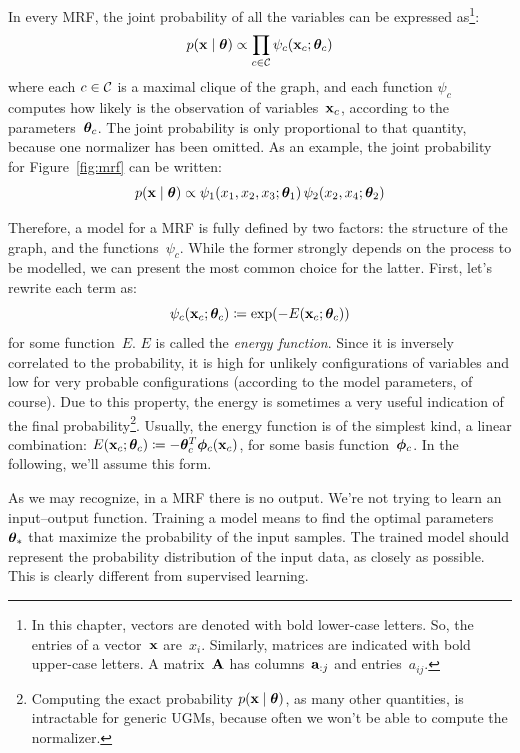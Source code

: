 In every MRF, the joint probability of all the variables can be expressed
as\footnote{In this chapter, vectors are denoted with bold lower-case letters.
So, the entries of a vector~$\mathbf{x}$ are~$x_i$. Similarly, matrices are indicated
with bold upper-case letters. A matrix~$\mathbf{A}$ has columns~$\mathbf{a}_{:j}$
and entries~$a_{ij}$.}:
\begin{equation}
	p(\mathbf{x} \mid \bm{\theta}) \propto
		\prod_{c \in \mathcal{C}} \psi_c(\mathbf{x}_c; \bm{\theta}_c)
\end{equation}
where each $c \in \mathcal{C}$ is a maximal clique of the graph, and each
function $\psi_c$ computes how likely is the observation of variables~$\mathbf{x}_c$,
according to the parameters~$\bm{\theta}_c$. The joint probability is only
proportional to that quantity, because one normalizer has been omitted. As an
example, the joint probability for Figure~\ref{fig:mrf} can be written:
\[
	p(\mathbf{x} \mid \bm{\theta}) \propto
	\psi_1(x_1, x_2, x_3; \bm{\theta}_1) \, \psi_2(x_2, x_4; \bm{\theta}_2)
\]

Therefore, a model for a MRF is fully defined by two factors: the structure of
the graph, and the functions~$\psi_c$. While the former strongly depends on
the process to be modelled, we can present the most common choice for the
latter. First, let's rewrite each term as:
\begin{equation}
	\psi_c(\mathbf{x}_c; \bm{\theta}_c) \coloneqq \exp(-E(\mathbf{x}_c; \bm{\theta}_c))
	\label{eq:ugm-energy-based}
\end{equation}
for some function~$E$. $E$ is called the \emph{energy function}. Since it is
inversely correlated to the probability, it is high for unlikely
configurations of variables and low for very probable configurations
(according to the model parameters, of course). Due to this property, the
energy is sometimes a very useful indication of the final
probability\footnote{Computing the exact probability $p(\mathbf{x} \mid \bm{\theta})$,
as many other quantities, is intractable for generic UGMs, because often we
won't be able to compute the normalizer.}.  Usually, the energy function is of
the simplest kind, a linear combination: $E(\mathbf{x}_c; \bm{\theta}_c) \coloneqq
-\bm{\theta}_c^T \bm{\phi}_c(\mathbf{x}_c)$, for some basis function~$\bm{\phi}_c$. In the
following, we'll assume this form.

As we may recognize, in a MRF there is no output. We're not trying to learn an
input--output function. Training a model means to find the optimal parameters
${\bm{\theta}}_*$ that maximize the probability of the input samples. The
trained model should represent the probability distribution of the input data,
as closely as possible. This is clearly different from supervised learning.

